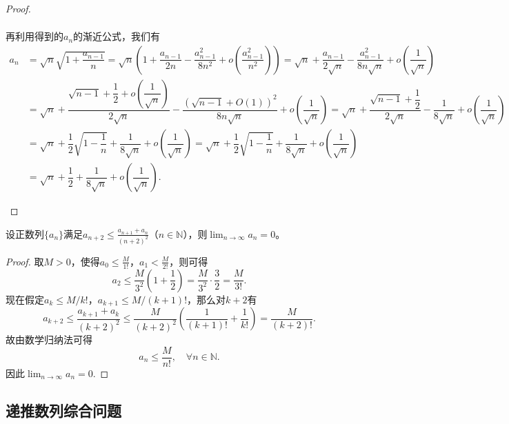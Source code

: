 \documentclass[../../main.tex]{subfiles}%
\begin{document}
\begin{proof}
\begin{enumerate}
\begin{align*}
\end{align*}
再利用得到的$a_n$的渐近公式，我们有
\begin{align*}
a_n &= \sqrt{n}\sqrt{1 + \dfrac{a_{n-1}}{n}} = \sqrt{n}\left( 1 + \dfrac{a_{n-1}}{2n} - \dfrac{a_{n-1}^2}{8n^2} + o\left( \dfrac{a_{n-1}^2}{n^2} \right) \right) = \sqrt{n} + \dfrac{a_{n-1}}{2\sqrt{n}} - \dfrac{a_{n-1}^2}{8n\sqrt{n}} + o\left( \dfrac{1}{\sqrt{n}} \right) \\
&= \sqrt{n} + \dfrac{\sqrt{n - 1} + \dfrac{1}{2} + o\left( \dfrac{1}{\sqrt{n}} \right)}{2\sqrt{n}} - \dfrac{\left( \sqrt{n - 1} + O(1) \right)^2}{8n\sqrt{n}} + o\left( \dfrac{1}{\sqrt{n}} \right) = \sqrt{n} + \dfrac{\sqrt{n - 1} + \dfrac{1}{2}}{2\sqrt{n}} - \dfrac{1}{8\sqrt{n}} + o\left( \dfrac{1}{\sqrt{n}} \right) \\
&= \sqrt{n} + \dfrac{1}{2}\sqrt{1 - \dfrac{1}{n}} + \dfrac{1}{8\sqrt{n}} + o\left( \dfrac{1}{\sqrt{n}} \right) = \sqrt{n} + \dfrac{1}{2}\sqrt{1 - \dfrac{1}{n}} + \dfrac{1}{8\sqrt{n}} + o\left( \dfrac{1}{\sqrt{n}} \right) \\
&= \sqrt{n} + \dfrac{1}{2} + \dfrac{1}{8\sqrt{n}} + o\left( \dfrac{1}{\sqrt{n}} \right).
\end{align*}

\end{enumerate}
\end{proof}

\begin{example}
设正数列\(\{a_n\}\)满足\(a_{n+2} \leqslant \frac{a_{n+1} + a_n}{(n+2)^2}\)（\(n \in \mathbb{N}\)），则\(\lim_{n \to \infty} a_n = 0\)。
\end{example}
\begin{proof}
取\(M > 0\)，使得\(a_0 \leqslant \frac{M}{1!}\)，\(a_1 < \frac{M}{2!}\)，则可得
\[
a_2 \leqslant \frac{M}{3^2}\left(1 + \frac{1}{2}\right) = \frac{M}{3^2} \cdot \frac{3}{2} = \frac{M}{3!}.
\]
现在假定\(a_k \leqslant M/k!\)，\(a_{k+1} \leqslant M/(k+1)!\)，那么对\(k+2\)有
\[
a_{k+2} \leqslant \frac{a_{k+1} + a_k}{(k+2)^2} \leqslant \frac{M}{(k+2)^2}\left( \frac{1}{(k+1)!} + \frac{1}{k!} \right) = \frac{M}{(k+2)!}.
\]
故由数学归纳法可得$$a_n\leqslant \frac{M}{n!},\quad \forall n\in \mathbb{N}.$$
因此\(\lim_{n \to \infty} a_n = 0.\)
\end{proof}


\subsection{递推数列综合问题}
\end{document}
